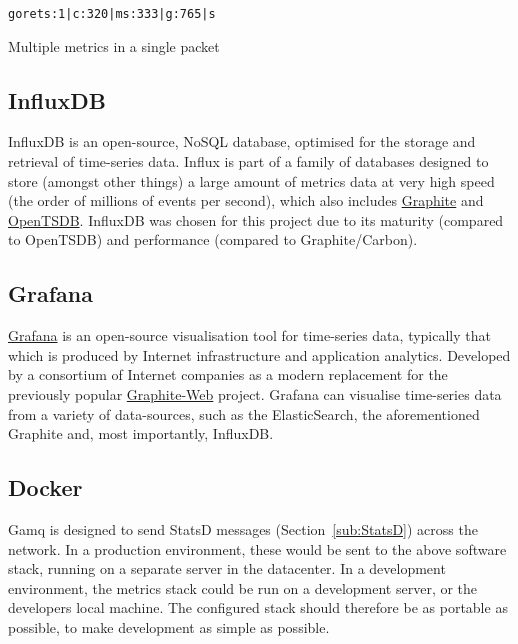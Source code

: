 \begin{listing}
  \centering
  \texttt{gorets:1|c\nglork:320|ms\ngaugor:333|g\nuniques:765|s}
  \caption{Multiple metrics in a single packet}
  \label{lst:statsdMultiplePackets}
\end{listing}

\subsection{InfluxDB}
\label{sub:InfluxDB}

InfluxDB is an open-source, NoSQL database, optimised for the storage and
retrieval of \gls{time-series data}. Influx is part of a family of databases
designed to store (amongst other things) a large amount of metrics data at very
high speed (the order of millions of events per second), which also includes
\href{http://graphite.wikidot.com/}{Graphite} and
\href{http://opentsdb.net/}{OpenTSDB}. InfluxDB was chosen for this project due
to its maturity (compared to OpenTSDB) and performance (compared to
Graphite/Carbon).

\subsection{Grafana}
\label{sub:Grafana}

\href{http://grafana.org/}{Grafana} is an open-source visualisation tool for
\gls{time-series data}, typically that which is produced by Internet
infrastructure and application analytics. Developed by a consortium of Internet
companies as a modern replacement for the previously popular
\href{https://github.com/graphite-project/graphite-web}{Graphite-Web} project.
Grafana can visualise \gls{time-series data} from a variety of data-sources,
such as the ElasticSearch, the aforementioned Graphite and, most importantly,
InfluxDB.


\subsection{Docker}
\label{sub:dockerDesign}

Gamq is designed to send StatsD messages (Section~\ref{sub:StatsD}) across the
network. In a production environment, these would be sent to the above software
stack, running on a separate server in the datacenter. In a development
environment, the metrics stack could be run on a development server, or the
developers local machine. The configured stack should therefore be as portable
as possible, to make development as simple as possible. 

